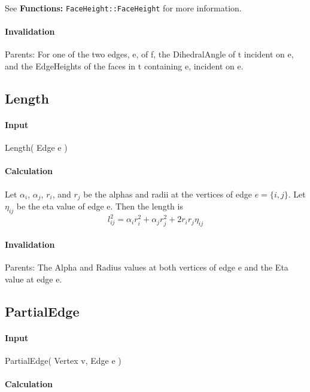 See \textbf{Functions: }\texttt{FaceHeight::FaceHeight} for more information.

\paragraph{Invalidation}

\bigskip Parents: For one of the two edges, e, of f, the DihedralAngle of t
incident on e, and the EdgeHeights of the faces in t containing e, incident
on e.

\subsection{Length}

\paragraph{Input}

Length( Edge e )

\paragraph{Calculation}

Let $\alpha _{i}$, $\alpha _{j}$, $r_{i}$, and $r_{j}$ be the alphas and
radii at the vertices of edge $e=\{i,j\}$. Let $\eta _{ij}$ be the eta value
of edge e. Then the length is 
\begin{equation*}
l_{ij}^{2}=\alpha _{i}r_{i}^{2}+\alpha _{j}r_{j}^{2}+2r_{i}r_{j}\eta _{ij}
\end{equation*}

\paragraph{Invalidation}

\bigskip Parents: The Alpha and Radius values at both vertices of edge e and
the Eta value at edge e.

\subsection{PartialEdge}

\paragraph{Input}

PartialEdge( Vertex v, Edge e )

\paragraph{Calculation}

